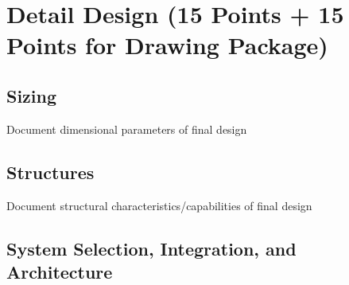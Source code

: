 \documentclass[report]{byu-aero}
\begin{document}
\section{Detail Design (15 Points + 15 Points for Drawing Package)}
\label{sec:detaildesign}

\subsection{Sizing}
\label{ssec:sizing}

Document dimensional parameters of final design

\subsection{Structures}
\label{ssec:structures}

Document structural characteristics/capabilities of final design

\subsection{System Selection, Integration, and Architecture}
\label{ssec:systemdetails}
\end{document}
